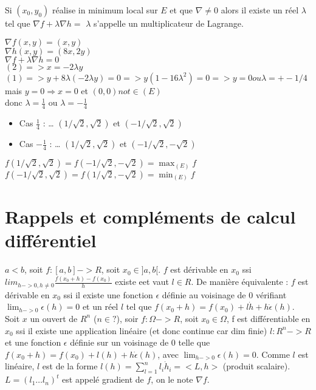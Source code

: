 		
		Si $(x_0, y_0)$ réalise in minimum local sur $E$ et que $\nabla \neq 0$ alors il existe un réel $\lambda$ tel que $\nabla f + \lambda \nabla h = $
		$\lambda$ s'appelle un multiplicateur de Lagrange.
		
		
		$\nabla f(x, y) = ( x, y)$ \\
		$\nabla h(x, y) = (8x, 2y)$ \\
		$\nabla f + \lambda \nabla h = 0$ \\
		$(2) => x = -2\lambda y$ \\
		$(1) => y+8\lambda (-2\lambda y) = 0 => y(1-16 \lambda^2) = 0 => y=0 ou \lambda = +- 1/4$ \\
		mais $y=0 \Rightarrow x=0$ et $(0, 0) not \in (E)$ \\
		donc $\lambda = \frac{1}{4}$ ou $\lambda = -\frac{1}{4}$
		
		\begin{itemize}
		\item Cas $\frac{1}{4}$ : 
		\dots
		$(1/ \sqrt{2}, \sqrt{2})$ et $(-1/ \sqrt{2}, \sqrt{2})$
		\item Cas $-\frac{1}{4}$ : 
		\dots
		$(1/ \sqrt{2}, \sqrt{2})$ et $(-1/ \sqrt{2}, -\sqrt{2})$
		\end{itemize}
		
		$f(1/ \sqrt{2}, \sqrt{2}) = f(-1/ \sqrt{2}, -\sqrt{2}) = \max_{(E)} f$
		$f(-1/ \sqrt{2}, \sqrt{2}) = f(1/ \sqrt{2}, -\sqrt{2}) = \min_{(E)} f$
		
	\section{Rappels et compléments de calcul différentiel}
	
	$a<b$, soit $f:[a, b]->R$, soit $x_0 \in ]a, b[$.
	$f$ est dérivable en $x_0$ ssi $lim_{h->0, h\neq 0} \frac{ f(x_0+h)-f(x_0) }{ h }$ existe eet vaut $l \in R$.
	De manière équivalente : $f$ est dérivable en $x_0$ ssi il existe une fonction $\epsilon$ définie au voisinage de $0$ vérifiant $\lim_{h->0} \epsilon (h) = 0$ et un réel $l$ tel que $f(x_0+h) = f(x_0)+l\dot h + h \dot \epsilon (h)$.
	Soit $x$ un ouvert de $R^n$ ($n \in ?$), soir $f:\Omega ->R$, soit $x_0 \in \Omega$, f est différentiable en $x_0$ ssi il existe une application linéaire (et donc continue car dim finie) $l:R^n->R$ et une fonction $\epsilon$ définie sur un voisinage de $0$ telle que $f(x_0+h) = f(x_0)+l(h) + h \dot \epsilon (h)$, avec $\lim_{h->0} \epsilon (h) = 0$.
	Comme $l$ est linéaire, $l$ est de la forme $l(h) = \sum _{l=1}^n l_i \dot h_i = <L,h>$ (produit scalaire). 
	$L= ( l_1 \dots l_n )^t$ 
	est appelé gradient de $f$, on le note $\nabla f$.
	
